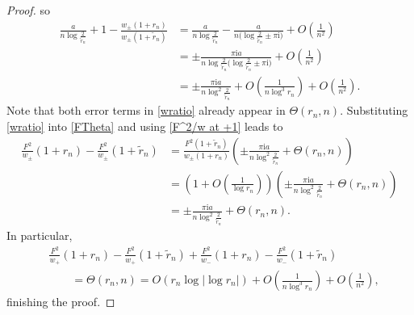 \documentclass[11pt]{article}
\numberwithin{equation}{section}
\newcommand{\I}{\mathrm{i}}
\numberwithin{equation}{section}
\begin{document}
\begin{proof}
so
\begin{align}\nonumber
 \frac{a}{ n\log \frac{2}{\tilde r_n}} + 1-\frac{w_\pm(1+r_n)}{w_\pm(1+\tilde r_n)} &= \frac{a}{ n\log \frac{2}{\tilde r_n}} - \frac{a}{n\big(\log \frac{2}{\tilde r_n}\pm \pi \I\big)} + O\left(\frac{1}{n^2}\right)
 \\\nonumber
 &= \pm \frac{\pi\I a }{n \log \frac{2}{\tilde r_n}\big(\log \frac{2}{\tilde r_n}\pm \pi \I\big)} + O\left(\frac{1}{n^2}\right)
 \\\label{wratio}
 &= \pm\frac{\pi\I a}{n \log^2\frac{2}{\tilde r_n}} + O\left(\frac{1}{n \log^3 r_n}\right)+ O\left(\frac{1}{n^2}\right).
\end{align}
Note that both error terms in \eqref{wratio} already appear in $\Theta(r_n, n)$. Substituting \eqref{wratio} into \eqref{FTheta} and using \eqref{F^2/w at +1} leads to
\begin{align*}
 \frac{F^2}{w_\pm}(1+r_n) - \frac{F^2}{w_\pm}(1+\tilde r_n) &= \frac{F^2(1+\tilde r_n)}{w_\pm(1+r_n)}\left( \pm \frac{\pi\I a}{n \log^2\frac{2}{\tilde r_n}} + \Theta(r_n, n)\right)
 \\
 &= \left(1+ O\left(\frac{1}{\log r_n}\right)\right)\left(\pm\frac{\pi\I a}{n \log^2\frac{2}{\tilde r_n}} + \Theta(r_n, n)\right)
 \\
 &= \pm\frac{\pi\I a}{n \log^2\frac{2}{\tilde r_n}} + \Theta(r_n, n).
\end{align*}
In particular,
\begin{align*}
 &\frac{F^2}{w_+}(1+r_n)-\frac{F^2}{w_+}(1+\tilde r_n)+\frac{F^2}{w_-}(1+r_n)-\frac{F^2}{w_-}(1+\tilde r_n)
 \\
 &\qquad= \Theta(r_n ,n)= O(r_n \log |\log r_n|) + O\left(\frac{1}{n\log^3 r_n}\right) + O\left(\frac{1}{n^2}\right),
\end{align*}
finishing the proof.
\end{proof}
\end{document}

